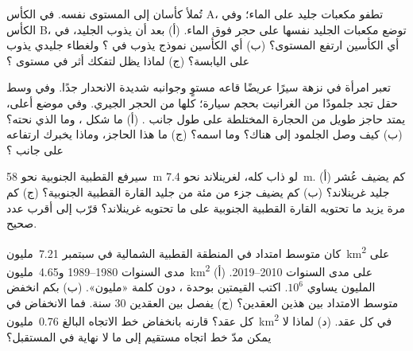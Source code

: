 \begin{exercise}[$\star\star$]\label{exo:g8:ice-on-earth:8}
تُملأ كأسان إلى المستوى نفسه. في الكأس A، تطفو مكعبات جليد على الماء؛ وفي
الكأس B، توضع مكعبات الجليد نفسها على حجر فوق الماء. (أ) بعد أن يذوب الجليد،
في أي الكأسين ارتفع المستوى؟ (ب) أي الكأسين نموذج  يذوب في ؟
ولغطاء جليدي يذوب على اليابسة؟ (ج) لماذا يظل لتفكك  أثر في مستوى
؟
\end{exercise}

\begin{exercise}[$\star\star$]\label{exo:g8:ice-on-earth:9}
تعبر امرأة في نزهة سيرًا  عريضًا قاعه مستوٍ وجوانبه شديدة الانحدار جدًا.
وفي وسط حقل تجد جلمودًا من الغرانيت بحجم سيارة؛   كلها من الحجر
الجيري. وفي موضع أعلى، يمتد حاجز طويل من الحجارة المختلطة على طول جانب .
(أ) ما شكل ، وما الذي نحته؟ (ب) كيف وصل الجلمود إلى هناك؟ وما اسمه؟
(ج) ما هذا الحاجز، وماذا يخبرك ارتفاعه على جانب ؟
\end{exercise}

\begin{exercise}[$\star\star$]\label{exo:g8:ice-on-earth:10}
سيرفع   القطبية الجنوبية  نحو \qty{58}{m} لو ذاب
كله،  لغرينلاند نحو \qty{7.4}{m}. (أ) كم يضيف عُشر جليد
غرينلاند؟ (ب) كم يضيف جزء من مئة من جليد القارة القطبية الجنوبية؟ (ج) كم مرة
يزيد ما تحتويه القارة القطبية الجنوبية على ما تحتويه غرينلاند؟ قرّب إلى أقرب
عدد صحيح.
\end{exercise}

\begin{exercise}[$\star\star\star$]\label{exo:g8:ice-on-earth:11}
كان متوسط امتداد  في المنطقة القطبية الشمالية في سبتمبر
\num{7.21}~مليون~\unit{km^2} على مدى السنوات 1980--1989
و\num{4.65}~مليون~\unit{km^2} على مدى السنوات 2010--2019. (أ) المليون يساوي
$10^6$. اكتب القيمتين بوحدة ، دون كلمة «مليون».
(ب) بكم انخفض متوسط الامتداد بين هذين العقدين؟
(ج) يفصل بين العقدين 30 سنة. فما الانخفاض في كل عقد؟
قارنه بانخفاض خط الاتجاه البالغ \num{0.76}~مليون~\unit{km^2} في كل عقد.
(د) لماذا لا يمكن مدّ خط اتجاه مستقيم إلى ما لا نهاية في
المستقبل؟
\end{exercise}


